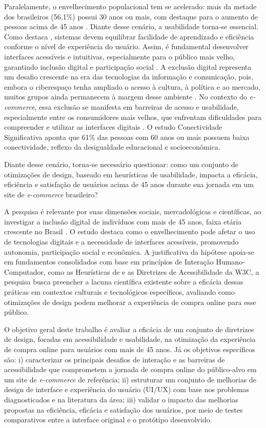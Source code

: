 \documentclass[12pt,a4paper]{article}
\begin{document}
Paralelamente, o envelhecimento populacional tem se acelerado: mais da metade dos brasileiros (56,1\%) possui 30 anos ou mais, com destaque para o aumento de pessoas acima de 45 anos \cite{ibge2022}. Diante desse cenário, a usabilidade torna-se essencial. Como destaca , sistemas devem equilibrar facilidade de aprendizado e eficiência conforme o nível de experiência do usuário. Assim, é fundamental desenvolver interfaces acessíveis e intuitivas, especialmente para o público mais velho, garantindo inclusão digital e participação social \cite{rodriguessantos2022}. A exclusão digital representa um desafio crescente na era das tecnologias da informação e comunicação, pois, embora o ciberespaço tenha ampliado o acesso à cultura, à política e ao mercado, muitos grupos ainda permanecem à margem desse ambiente \cite{moreira2023}. No contexto do \textit{e-commerce}, essa exclusão se manifesta em barreiras de acesso e usabilidade, especialmente entre os consumidores mais velhos, que enfrentam dificuldades para compreender e utilizar as interfaces digitais \cite{cetic2024}. O estudo Conectividade Significativa aponta que 61\% das pessoas com 60 anos ou mais possuem baixa conectividade, reflexo da desigualdade educacional e socioeconômica.

Diante desse cenário, torna-se necessário questionar: como um conjunto de otimizações de design, baseado em heurísticas de usabilidade, impacta a eficácia, eficiência e satisfação de usuários acima de 45 anos durante sua jornada em um site de \textit{e-commerce} brasileiro?

A pesquisa é relevante por suas dimensões sociais, mercadológicas e científicas, ao investigar a inclusão digital de indivíduos com mais de 45 anos, faixa etária crescente no Brasil \cite{ibge2022}. O estudo destaca como o envelhecimento pode afetar o uso de tecnologias digitais e a necessidade de interfaces acessíveis, promovendo autonomia, participação social e econômica. A justificativa da hipótese apoia-se em fundamentos consolidados com base em princípios de Interação Humano-Computador, como as Heurísticas de  e as Diretrizes de Acessibilidade da W3C, a pesquisa busca preencher a lacuna científica existente sobre a eficácia dessas práticas em contextos culturais e tecnológicos específicos, avaliando como otimizações de design podem melhorar a experiência de compra online para esse público.

O objetivo geral deste trabalho é avaliar a eficácia de um conjunto de diretrizes de design, focadas em acessibilidade e usabilidade, na otimização da experiência de compra online para usuários com mais de 45 anos. Já os objetivos específicos são: i) caracterizar os principais desafios de interação e as barreiras de acessibilidade que comprometem a jornada de compra online do público-alvo em um site de \textit{e-commerce} de referência; ii) estruturar um conjunto de melhorias de design de interface e experiência do usuário (UI/UX) com base nos problemas diagnosticados e na literatura da área; iii) validar o impacto das melhorias propostas na eficiência, eficácia e satisfação dos usuários, por meio de testes comparativos entre a interface original e o protótipo desenvolvido.
\end{document}
